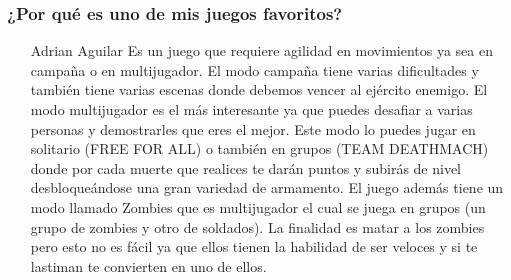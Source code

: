 \subsubsection{¿Por qué es uno de mis juegos favoritos?}
\begin{itemize}
\item[Adrian Aguilar]Es un juego que requiere agilidad en movimientos ya sea en campaña o en multijugador. El modo campaña tiene varias dificultades y también tiene varias escenas donde debemos vencer al ejército enemigo. El modo multijugador es el más interesante ya que puedes desafiar a varias personas y demostrarles que eres el mejor. Este modo lo puedes jugar en solitario (FREE FOR ALL) o también en grupos (TEAM DEATHMACH) donde por cada muerte que realices te darán puntos y subirás de nivel desbloqueándose una gran variedad de armamento. El juego además tiene un modo llamado Zombies que es multijugador el cual se juega en grupos (un grupo de zombies y otro de soldados). La finalidad es matar a los zombies pero esto no es fácil ya que ellos tienen la habilidad de ser veloces y si te lastiman te convierten en uno de ellos.
\end{itemize}
